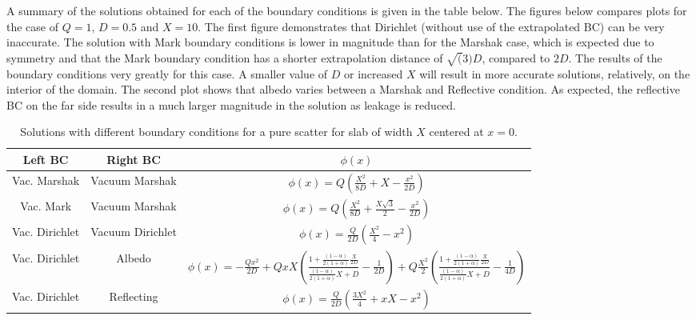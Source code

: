\documentclass[12pt]{article}
\newcommand{\A}{\frac{(1-\alpha)}{2(1+\alpha)}}
\newenvironment{solnum}[2][Solution]{\begin{trivlist}
\item[\hskip \labelsep {\bfseries #1}\hskip \labelsep {\bfseries #2:}]\hspace{0.3in}\newline\newline}{\end{trivlist}}
\begin{document}
\begin{solnum}{2}
    



\end{solnum}


%
\clearpage
    
    A summary of the solutions obtained for each of the boundary conditions is given
    in the table below. The figures below compares plots for the case of $Q=1$,
    $D=0.5$ and $X=10$.  The first figure demonstrates that Dirichlet (without use of
    the extrapolated BC) can be very inaccurate.  The solution with Mark boundary
    conditions is lower in magnitude than for the Marshak case, which is expected due
    to symmetry and that the Mark boundary condition has a shorter extrapolation
    distance of $\sqrt(3)D$, compared to $2D$. The results of the boundary
    conditions very greatly for this case.  A smaller value of $D$ or increased $X$
    will result in more accurate solutions, relatively, on the interior of the
    domain. The second plot shows that albedo varies between a Marshak and Reflective
    condition.  As expected, the
    reflective BC on the far side results in a much larger magnitude in the solution
    as leakage is reduced.
    \begin{table}[h!]
        \centering
        \caption{Solutions with different boundary conditions for  a pure scatter for slab of width $X$ centered at
        $x=0$.}
        \begin{tabular}{|c|c|c|} \hline
            Left BC & Right BC & $\phi(x)$ \\ \hline
            Vac. Marshak & Vacuum Marshak & $\phi(x) = Q\left(\frac{X^2}{8D} + X-\frac{x^2}{2D} 
            \right)            $ \\ 
            Vac. Mark & Vacuum Marshak & $\phi(x) = Q\left(
            \frac{X^2}{8D} + \frac{X\sqrt{3}}{2}-\frac{x^2}{2D}\right)$ \\ 
            Vac. Dirichlet  & Vacuum Dirichlet & $\phi(x) = \frac{Q}{2D}\left( 
            \frac{X^2}{4} - x^2\right)  $ \\ 
            Vac. Dirichlet    & Albedo  & $\phi(x) = -\frac{Qx^2}{2D} +
            QxX\left(\frac{1+\A\frac{X}{2D}}{\A X + D} - \frac{1}{2D}  \right) +
            Q\frac{X^2}{2}\!\! \left(\frac{1+\A\frac{X}{2D}}{\A X +
            D}-\frac{1}{4D}\right) $ \\
            Vac. Dirichlet    & Reflecting & $\phi(x) =
            \frac{Q}{2D}\left(\frac{3X^2}{4} + xX  - {x^2}\right)$ \\ \hline
        \end{tabular}
    \end{table}
\end{document}
